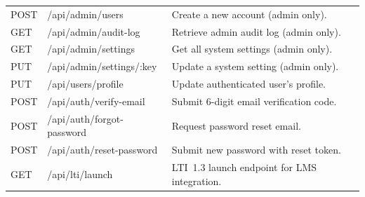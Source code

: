\begin{longtable}{>{\raggedright\arraybackslash}p{1.6cm} >{\raggedright\arraybackslash}p{5.0cm} >{\raggedright\arraybackslash}p{8.1cm}}
  POST & /api/admin/users           & Create a new account (admin only). \\
  GET  & /api/admin/audit-log       & Retrieve admin audit log (admin only). \\
  GET  & /api/admin/settings        & Get all system settings (admin only). \\
  PUT  & /api/admin/settings/:key   & Update a system setting (admin only). \\
  PUT  & /api/users/profile         & Update authenticated user's profile. \\
  POST & /api/auth/verify-email     & Submit 6-digit email verification code. \\
  POST & /api/auth/forgot-password  & Request password reset email. \\
  POST & /api/auth/reset-password   & Submit new password with reset token. \\
  GET  & /api/lti/launch            & LTI~1.3 launch endpoint for LMS integration. \\
\end{longtable}
